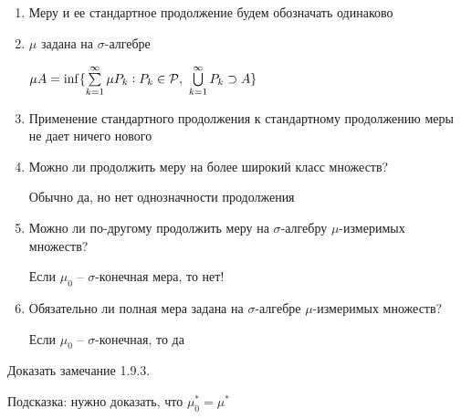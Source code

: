 \documentclass[12pt]{article}
\begin{document}
\begin{Remark}{}
    \begin{enumerate}
        \item Меру и ее стандартное продолжение будем обозначать одинаково
        \item $\mu$ задана на $\sigma$-алгебре 
        
        $\mu A = \inf \{\sum\limits_{k = 1}^\infty \mu P_k : P_k \in \P,\ \bigcup\limits_{k = 1}^\infty P_k \supset A\}$

        \item Применение стандартного продолжения к стандартному продолжению меры не дает ничего нового
        \item Можно ли продолжить меру на более широкий класс множеств? 
        
        Обычно да, но нет однозначности продолжения 

        \item Можно ли по-другому продолжить меру на $\sigma$-алгебру $\mu$-измеримых множеств?
        
        Если $\mu_0$ -- $\sigma$-конечная мера, то нет!

        \item Обязательно ли полная мера задана на $\sigma$-алгебре $\mu$-измеримых множеств?
        
        Если $\mu_0$ -- $\sigma$-конечная, то да
    \end{enumerate}
\end{Remark}

\begin{Exercise}{}
    Доказать замечание 1.9.3.

    Подсказка: нужно доказать, что $\mu_0^* = \mu^*$
\end{Exercise}
\end{document}
